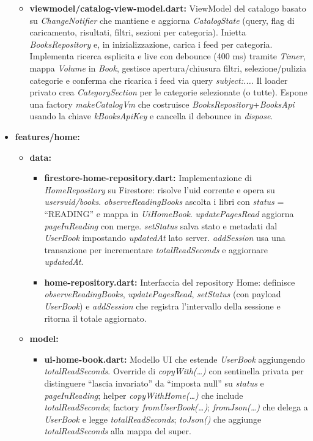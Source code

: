 \documentclass{article}
\begin{document}
\begin{itemize}
\begin{itemize}
    \item \textbf{viewmodel/catalog-view-model.dart:} ViewModel del catalogo basato su \textit{ChangeNotifier} che mantiene e aggiorna \textit{CatalogState} (query, flag di caricamento, risultati, filtri, sezioni per categoria). Inietta \textit{BooksRepository} e, in inizializzazione, carica i feed per categoria. Implementa ricerca esplicita e live con debounce (400 ms) tramite \textit{Timer}, mappa \textit{Volume} in \textit{Book}, gestisce apertura/chiusura filtri, selezione/pulizia categorie e conferma che ricarica i feed via query \textit{subject:...}. Il loader privato crea \textit{CategorySection} per le categorie selezionate (o tutte). Espone una factory \textit{makeCatalogVm} che costruisce \textit{BooksRepository}+\textit{BooksApi} usando la chiave \textit{kBooksApiKey} e cancella il debounce in \textit{dispose}.
  \end{itemize}
  \item \textbf{features/home:}
  \begin{itemize}
    \item \textbf{data:}
    \begin{itemize}
      \item \textbf{firestore-home-repository.dart:} Implementazione di \textit{HomeRepository} su Firestore: risolve l’uid corrente e opera su \textit{users{}uid{}/books}. \textit{observeReadingBooks} ascolta i libri con \textit{status} = “READING” e mappa in \textit{UiHomeBook}. \textit{updatePagesRead} aggiorna \textit{pageInReading} con merge. \textit{setStatus} salva stato e metadati dal \textit{UserBook} impostando \textit{updatedAt} lato server. \textit{addSession} usa una transazione per incrementare \textit{totalReadSeconds} e aggiornare \textit{updatedAt}.
      \item \textbf{home-repository.dart:} Interfaccia del repository Home: definisce \textit{observeReadingBooks}, \textit{updatePagesRead}, \textit{setStatus} (con payload \textit{UserBook}) e \textit{addSession} che registra l’intervallo della sessione e ritorna il totale aggiornato.
    \end{itemize}
    \item \textbf{model:}
    \begin{itemize}
      \item \textbf{ui-home-book.dart:} Modello UI che estende \textit{UserBook} aggiungendo \textit{totalReadSeconds}. Override di \textit{copyWith(\ldots)} con sentinella privata per distinguere “lascia invariato” da “imposta null” su \textit{status} e \textit{pageInReading}; helper \textit{copyWithHome(\ldots)} che include \textit{totalReadSeconds}; factory \textit{fromUserBook(\ldots)}; \textit{fromJson(\ldots)} che delega a \textit{UserBook} e legge \textit{totalReadSeconds}; \textit{toJson()} che aggiunge \textit{totalReadSeconds} alla mappa del super.

\end{itemize}
\end{itemize}
\end{itemize}
\end{document}
